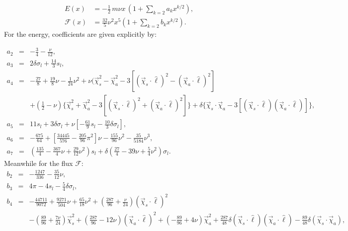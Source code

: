 \documentclass[aps,prd,amsmath,floatfix,twocolumn,superscriptaddress,nofootinbib,showpacs]{revtex4-1}
\newcommand{\ellHat}{\ensuremath{\hat{\ell}}}
\begin{document}
\begin{eqnarray}
E(x) &= -\frac{1}{2}\,m\nu x\,\left(1+\sum_{k=2}a_{k}x^{k/2}\right), \label{eq:EExpansion} \\
\mathcal{F}(x) &= \frac{32}{5}\nu^{2}x^{5}\left(1+\sum_{k=2}
  b_{k}x^{k/2}\right).
\label{eq:FExpansion}
\end{eqnarray}
For the energy, coefficients are given explicitly by:
\begin{widetext}
\begin{eqnarray}
a_{2} &=& -\frac{3}{4} - \frac{\nu}{12}, \\
a_{3} &=&  2\delta\sigma_{l}+\frac{14}{3}s_{l}, \\
a_{4} &=& -\frac{27}{8} + \frac{19}{8}\nu - \frac{1}{24}\nu^{2} +
\nu{(\vec{\chi}_{s}^{2}-\vec{\chi}_{a}^{2} -
  3[(\vec{\chi}_{s}\cdot\ellHat)^{2} -
  (\vec{\chi}_{a}\cdot\ellHat)^{2}]} \nonumber \\
  &&+ (\frac{1}{2}-\nu)\{ \vec{\chi}_{s}^{2}+\vec{\chi}_{a}^2-3[(\vec{\chi}_{s}\cdot\ellHat)^{2} + (\vec{\chi}_{a}\cdot\ellHat)^{2}]\}+\delta\{\vec{\chi}_{s}\cdot\vec{\chi}_{a} - 3[(\vec{\chi}_{s}\cdot\ellHat)(\vec{\chi}_{a}\cdot\ellHat)]\},
\label{eq:Energy-a4}\\
a_{5} &=& 11s_{l} + 3\delta\sigma_{l} + \nu\left[-\frac{61}{9}s_{l} - \frac{10}{3}\delta\sigma_{l}\right],\\
a_{6} & =& -\frac{675}{64} + \left[\frac{34445}{576}-\frac{205}{96}\pi^{2}\right]\nu - \frac{155}{96}\nu^{2}-\frac{35}{5184}\nu^{3},\\
a_{7} &=& \left(\frac{135}{4} - \frac{367}{4}\nu + \frac{29}{12}\nu^{2}\right)s_{l} + \delta\left(\frac{27}{4}-39\nu+\frac{5}{4}\nu^{2}\right)\sigma_l.
\end{eqnarray}
Meanwhile for the flux $\mathcal{F}$:
\begin{eqnarray}
b_{2} &=& -\frac{1247}{336}-\frac{35}{12}\nu, \\
b_{3} &=& 4\pi - 4s_l - \frac{5}{4}\delta\sigma_{l}, \\
b_{4} &=& -\frac{44711}{9072} + \frac{9271}{504}\nu + \frac{65}{18}\nu^{2}  + \left(\frac{287}{96}+\frac{\nu}{24}\right)(\vec{\chi}_{s}\cdot\ellHat)^{2}\nonumber\\
&&- \left(\frac{89}{96}+\frac{7\nu}{24}\right)\vec{\chi}_{s}^{2} + \left(\frac{287}{96}-12\nu\right)(\vec{\chi}_{a}\cdot\ellHat)^{2} + \left(-\frac{89}{96}+4\nu\right)\vec{\chi}_{a}^{2} + \frac{287}{48}\delta(\vec{\chi}_{s}\cdot\ellHat)(\vec{\chi}_{a}\cdot\ellHat) - \frac{89}{48}\delta(\vec{\chi}_{s}\cdot\vec{\chi}_{a}),
\label{eq:Flux-b4}
\\

\end{eqnarray}
\end{widetext}
\end{document}
